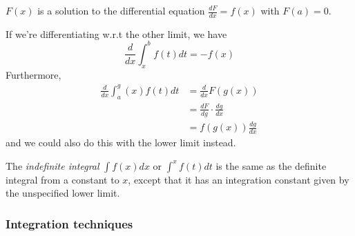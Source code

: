 \documentclass{../../template/note}
\begin{document}
    \begin{remark*}
        \(F(x)\) is a solution to the differential equation \(\frac{dF}{dx} = f(x)\) with \(F(a) = 0\).
    \end{remark*}

    \begin{corollary}
        If we're differentiating w.r.t the other limit, we have
        \[
            \frac{d}{dx} \int_x^b f(t) dt = -f(x)
        \]
        Furthermore, 
        \begin{align*}
            \frac{d}{dx} \int_a^g(x) f(t) dt &= \frac{d}{dx} F(g(x)) \\
            &= \frac{dF}{dg} \cdot \frac{dg}{dx} \\
            &= f(g(x)) \frac{dg}{dx}
        \end{align*}
        and we could also do this with the lower limit instead.
    \end{corollary}
    
    \begin{definition}
        The \emph{indefinite integral} \(\int f(x) dx\) or \(\int^x f(t) dt\) is the same as the definite integral from a constant to \(x\), except that it has an integration constant given by the unspecified lower limit.
    \end{definition}
    
    \subsubsection{Integration techniques}
\end{document}
